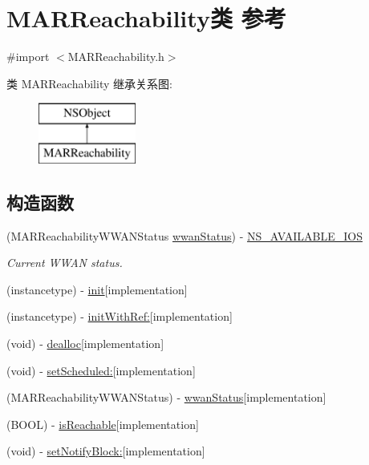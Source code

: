 \hypertarget{interface_m_a_r_reachability}{}\section{M\+A\+R\+Reachability类 参考}
\label{interface_m_a_r_reachability}


{\ttfamily \#import $<$M\+A\+R\+Reachability.\+h$>$}

类 M\+A\+R\+Reachability 继承关系图\+:\begin{figure}[H]
\begin{center}
\leavevmode
\includegraphics[height=2.000000cm]{interface_m_a_r_reachability}
\end{center}
\end{figure}
\subsection*{构造函数}
\begin{DoxyCompactItemize}
\item 
(M\+A\+R\+Reachability\+W\+W\+A\+N\+Status \hyperlink{interface_m_a_r_reachability_a7c116d20e2a6072f3521ce7d53d033b9}{wwan\+Status}) -\/ \hyperlink{interface_m_a_r_reachability_a54d3eee2e017ed0eb16f9f187c92e64a}{N\+S\+\_\+\+A\+V\+A\+I\+L\+A\+B\+L\+E\+\_\+\+I\+OS}
\begin{DoxyCompactList}\small\item\em Current W\+W\+AN status. \end{DoxyCompactList}\item 
(instancetype) -\/ \hyperlink{interface_m_a_r_reachability_a394738059b07f690a829f2c1a1556d4b}{init}{\ttfamily  \mbox{[}implementation\mbox{]}}
\item 
(instancetype) -\/ \hyperlink{interface_m_a_r_reachability_aeef8a85afd735d970144a6f0d36b71f0}{init\+With\+Ref\+:}{\ttfamily  \mbox{[}implementation\mbox{]}}
\item 
(void) -\/ \hyperlink{interface_m_a_r_reachability_a5c52363b677fa0ac30ecb4a92a707b11}{dealloc}{\ttfamily  \mbox{[}implementation\mbox{]}}
\item 
(void) -\/ \hyperlink{interface_m_a_r_reachability_a9fec680eafeaa0a2047b90c8507bba0d}{set\+Scheduled\+:}{\ttfamily  \mbox{[}implementation\mbox{]}}
\item 
(M\+A\+R\+Reachability\+W\+W\+A\+N\+Status) -\/ \hyperlink{interface_m_a_r_reachability_a7c116d20e2a6072f3521ce7d53d033b9}{wwan\+Status}{\ttfamily  \mbox{[}implementation\mbox{]}}
\item 
(B\+O\+OL) -\/ \hyperlink{interface_m_a_r_reachability_ae3321738fab3aa1aff0b9b38c1694640}{is\+Reachable}{\ttfamily  \mbox{[}implementation\mbox{]}}
\item 
(void) -\/ \hyperlink{interface_m_a_r_reachability_af67ad59328fec034a21ecda91131c2db}{set\+Notify\+Block\+:}{\ttfamily  \mbox{[}implementation\mbox{]}}
\end{DoxyCompactItemize}

